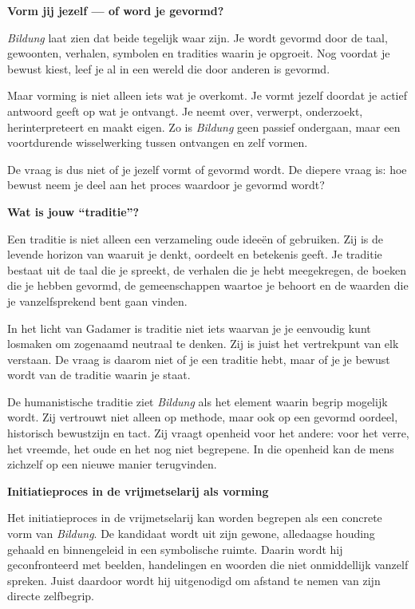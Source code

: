 \documentclass[11pt,twoside,openright]{memoir}
\begin{document}
\bigskip
\noindent
\textbf{Vorm jij jezelf — of word je gevormd?}
\medskip

\textit{Bildung} laat zien dat beide tegelijk waar zijn. Je wordt gevormd door de taal, gewoonten, verhalen, symbolen en tradities waarin je opgroeit. Nog voordat je bewust kiest, leef je al in een wereld die door anderen is gevormd.

Maar vorming is niet alleen iets wat je overkomt. Je vormt jezelf doordat je actief antwoord geeft op wat je ontvangt. Je neemt over, verwerpt, onderzoekt, herinterpreteert en maakt eigen. Zo is \textit{Bildung} geen passief ondergaan, maar een voortdurende wisselwerking tussen ontvangen en zelf vormen.

De vraag is dus niet of je jezelf vormt of gevormd wordt. De diepere vraag is: hoe bewust neem je deel aan het proces waardoor je gevormd wordt?

\bigskip
\noindent
\textbf{Wat is jouw ``traditie''?}
\medskip

Een traditie is niet alleen een verzameling oude ideeën of gebruiken. Zij is de levende horizon van waaruit je denkt, oordeelt en betekenis geeft. Je traditie bestaat uit de taal die je spreekt, de verhalen die je hebt meegekregen, de boeken die je hebben gevormd, de gemeenschappen waartoe je behoort en de waarden die je vanzelfsprekend bent gaan vinden.

In het licht van Gadamer is traditie niet iets waarvan je je eenvoudig kunt losmaken om zogenaamd neutraal te denken. Zij is juist het vertrekpunt van elk verstaan. De vraag is daarom niet of je een traditie hebt, maar of je je bewust wordt van de traditie waarin je staat.

De humanistische traditie ziet \textit{Bildung} als het element waarin begrip mogelijk wordt. Zij vertrouwt niet alleen op methode, maar ook op een gevormd oordeel, historisch bewustzijn en tact. Zij vraagt openheid voor het andere: voor het verre, het vreemde, het oude en het nog niet begrepene. In die openheid kan de mens zichzelf op een nieuwe manier terugvinden.

\bigskip
\noindent
\textbf{Initiatieproces in de vrijmetselarij als vorming}
\medskip

Het initiatieproces in de vrijmetselarij kan worden begrepen als een concrete vorm van \textit{Bildung}. De kandidaat wordt uit zijn gewone, alledaagse houding gehaald en binnengeleid in een symbolische ruimte. Daarin wordt hij geconfronteerd met beelden, handelingen en woorden die niet onmiddellijk vanzelf spreken. Juist daardoor wordt hij uitgenodigd om afstand te nemen van zijn directe zelfbegrip.
\end{document}
